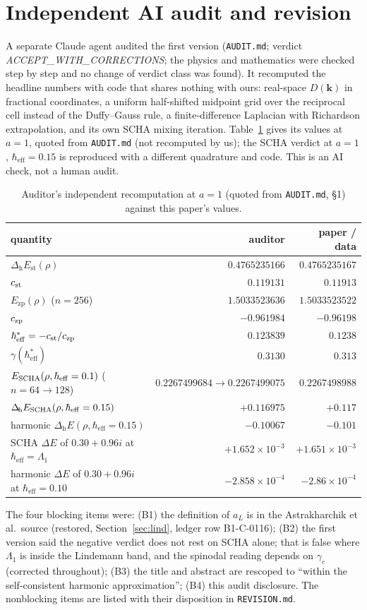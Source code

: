 \documentclass[10pt]{article}
\newcommand{\hb}{\hbar_{\mathrm{eff}}}
\newcommand{\Ezp}{E_{\mathrm{zp}}}
\newcommand{\Est}{E_{\mathrm{st}}}
\newcommand{\Lap}{\Delta_{\!\mathrm{h}}}
\begin{document}
\section{Independent AI audit and revision}\label{sec:audit}
A separate Claude agent audited the first version (\texttt{AUDIT.md}; verdict \emph{ACCEPT\_WITH\_CORRECTIONS}; the physics and mathematics were checked step by step and no change of verdict class was found). It recomputed the headline numbers with code that shares nothing with ours: real-space $D(\mathbf k)$ in fractional coordinates, a uniform half-shifted midpoint grid over the reciprocal cell instead of the Duffy--Gauss rule, a finite-difference Laplacian with Richardson extrapolation, and its own SCHA mixing iteration. Table~\ref{tab:audit} gives its values at $a=1$, quoted from \texttt{AUDIT.md} (not recomputed by us); the SCHA verdict at $a=1$, $\hb=0.15$ is reproduced with a different quadrature and code. This is an AI check, not a human audit.
\begin{table}[t]\centering\small\setlength{\tabcolsep}{5pt}
\caption{Auditor's independent recomputation at $a=1$ (quoted from \texttt{AUDIT.md}, \S1) against this paper's values.}\label{tab:audit}
\begin{tabular}{lrr}\toprule quantity & auditor & paper / data\\\midrule
$\Lap\Est(\rho)$ & $0.4765235166$ & $0.4765235167$\\
$c_{\rm st}$ & $0.119131$ & $0.11913$\\
$\Ezp(\rho)$ ($n=256$) & $1.5033523636$ & $1.5033523522$\\
$c_{\rm zp}$ & $-0.961984$ & $-0.96198$\\
$\hb^*=-c_{\rm st}/c_{\rm zp}$ & $0.123839$ & $0.1238$\\
$\gamma(\hb^*)$ & $0.3130$ & $0.313$\\
$E_{\rm SCHA}(\rho,\hb=0.1)$ ($n=64\to128$) & $0.2267499684\to0.2267499075$ & $0.2267498988$\\
$\Lap E_{\rm SCHA}(\rho,\hb=0.15)$ & $+0.116975$ & $+0.117$\\
harmonic $\Lap E(\rho,\hb=0.15)$ & $-0.10067$ & $-0.101$\\
SCHA $\Delta E$ of $0.30+0.96i$ at $\hb=\Lambda_1$ & $+1.652\times10^{-3}$ & $+1.651\times10^{-3}$\\
harmonic $\Delta E$ of $0.30+0.96i$ at $\hb=0.10$ & $-2.858\times10^{-4}$ & $-2.86\times10^{-4}$\\
\bottomrule\end{tabular}\end{table}
The four blocking items were: (B1) the definition of $a_L$ is in the Astrakharchik et al.\ source (restored, Section~\ref{sec:lind}, ledger row B1-C-0116); (B2) the first version said the negative verdict does not rest on SCHA alone; that is false where $\Lambda_1$ is inside the Lindemann band, and the spinodal reading depends on $\gamma_c$ (corrected throughout); (B3) the title and abstract are rescoped to ``within the self-consistent harmonic approximation''; (B4) this audit disclosure. The nonblocking items are listed with their disposition in \texttt{REVISION.md}.
\end{document}
